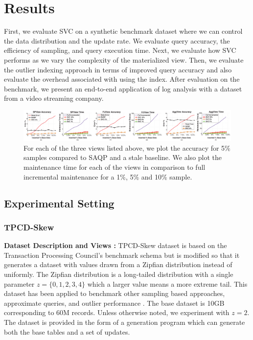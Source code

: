 \vspace{-.5em}
\section{Results}
\label{exp}
First, we evaluate SVC on a synthetic benchmark dataset where we can control the data distribution and the update rate.
We evaluate query accuracy, the efficiency of sampling, and query execution time.
Next, we evaluate how SVC performs as we vary the complexity of the materialized view.
Then, we evaluate the outlier indexing approach in terms of improved query accuracy and also evaluate the overhead associated with using the index.
After evaluation on the benchmark, we present an end-to-end application of log analysis with a dataset from a video streaming company.

\begin{figure}[ht!]
\hspace{-5.5em}
 \includegraphics[trim = 10mm 0mm 10mm 0mm, clip, scale=0.19]{exp/exp2-full.eps}\vspace{-1em}
 \caption{For each of the three views listed above, we plot the accuracy for 5\% samples compared to SAQP and a stale baseline. We also plot the maintenance time for each of the views in comparison to full incremental maintenance for a 1\%, 5\% and 10\% sample. \label{exp2update} }\vspace{-1em}
\end{figure}

\subsection{Experimental Setting}
\vspace{-.5em}
\subsubsection{TPCD-Skew}
{\noindent \bf Dataset Description and Views :}
TPCD-Skew dataset \cite{tpcdskew} is based on the Transaction Processing Council's benchmark
schema but is modified so that it generates a dataset with values drawn from a Zipfian distribution instead of uniformly.
The Zipfian distribution \cite{mitzenmacher2004brief} is a long-tailed distribution with a single parameter $z=\{0,1,2,3,4\}$ which a larger
value means a more extreme tail.
This dataset has been applied to benchmark other sampling based approaches, approximate queries, and outlier performance \cite{chaudhuri2001overcoming, agrawal2005database}.
The base dataset is 10GB corresponding to 60M records.
Unless otherwise noted, we experiment with $z=2$.
The dataset is provided in the form of a generation program which can generate both the base tables and a set of updates.

